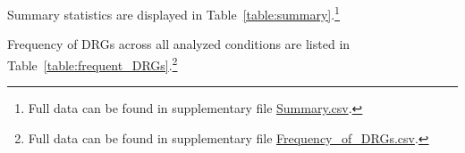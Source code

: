 \par Summary statistics are displayed in Table~\ref{table:summary}.\footnote{Full data can be found in supplementary file \href{Summary.csv}{Summary.csv}.}

\par Frequency of DRGs across all analyzed conditions are listed in Table~\ref{table:frequent_DRGs}.\footnote{Full data can be found in supplementary file \href{Frequency\_of\_DRGs.csv}{Frequency\_of\_DRGs.csv}.}



